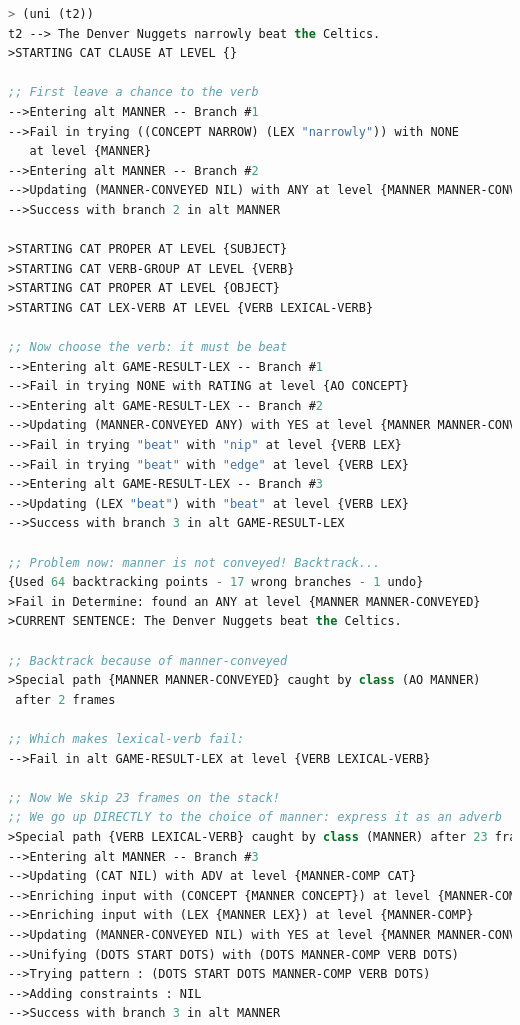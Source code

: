 \documentclass[10pt,a4paper]{report}
\begin{document}
\begin{lstlisting}[language=Lisp]
> (uni (t2))
t2 --> The Denver Nuggets narrowly beat the Celtics.
>STARTING CAT CLAUSE AT LEVEL {}

;; First leave a chance to the verb
-->Entering alt MANNER -- Branch #1
-->Fail in trying ((CONCEPT NARROW) (LEX "narrowly")) with NONE 
   at level {MANNER}
-->Entering alt MANNER -- Branch #2
-->Updating (MANNER-CONVEYED NIL) with ANY at level {MANNER MANNER-CONVEYED}
-->Success with branch 2 in alt MANNER

>STARTING CAT PROPER AT LEVEL {SUBJECT}
>STARTING CAT VERB-GROUP AT LEVEL {VERB}
>STARTING CAT PROPER AT LEVEL {OBJECT}
>STARTING CAT LEX-VERB AT LEVEL {VERB LEXICAL-VERB}

;; Now choose the verb: it must be beat
-->Entering alt GAME-RESULT-LEX -- Branch #1
-->Fail in trying NONE with RATING at level {AO CONCEPT}
-->Entering alt GAME-RESULT-LEX -- Branch #2
-->Updating (MANNER-CONVEYED ANY) with YES at level {MANNER MANNER-CONVEYED}
-->Fail in trying "beat" with "nip" at level {VERB LEX}
-->Fail in trying "beat" with "edge" at level {VERB LEX}
-->Entering alt GAME-RESULT-LEX -- Branch #3
-->Updating (LEX "beat") with "beat" at level {VERB LEX}
-->Success with branch 3 in alt GAME-RESULT-LEX

;; Problem now: manner is not conveyed! Backtrack...
{Used 64 backtracking points - 17 wrong branches - 1 undo}
>Fail in Determine: found an ANY at level {MANNER MANNER-CONVEYED}
>CURRENT SENTENCE: The Denver Nuggets beat the Celtics.

;; Backtrack because of manner-conveyed
>Special path {MANNER MANNER-CONVEYED} caught by class (AO MANNER) 
 after 2 frames

;; Which makes lexical-verb fail:
-->Fail in alt GAME-RESULT-LEX at level {VERB LEXICAL-VERB}

;; Now We skip 23 frames on the stack! 
;; We go up DIRECTLY to the choice of manner: express it as an adverb
>Special path {VERB LEXICAL-VERB} caught by class (MANNER) after 23 frames
-->Entering alt MANNER -- Branch #3
-->Updating (CAT NIL) with ADV at level {MANNER-COMP CAT}
-->Enriching input with (CONCEPT {MANNER CONCEPT}) at level {MANNER-COMP}
-->Enriching input with (LEX {MANNER LEX}) at level {MANNER-COMP}
-->Updating (MANNER-CONVEYED NIL) with YES at level {MANNER MANNER-CONVEYED}
-->Unifying (DOTS START DOTS) with (DOTS MANNER-COMP VERB DOTS)
-->Trying pattern : (DOTS START DOTS MANNER-COMP VERB DOTS)
-->Adding constraints : NIL
-->Success with branch 3 in alt MANNER


\end{lstlisting}
\end{document}
